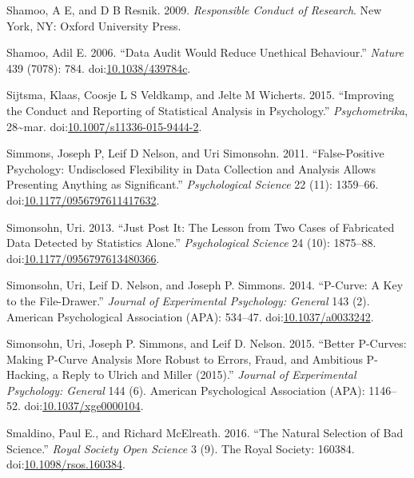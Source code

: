 \documentclass[a5paper]{book}
\begin{document}
\hypertarget{ref-isbn:9780199376025}{}
Shamoo, A E, and D B Resnik. 2009. \emph{Responsible Conduct of
Research}. New York, NY: Oxford University Press.

\hypertarget{ref-doi:10.1038ux2f439784c}{}
Shamoo, Adil E. 2006. ``Data Audit Would Reduce Unethical Behaviour.''
\emph{Nature} 439 (7078): 784.
doi:\href{https://doi.org/10.1038/439784c}{10.1038/439784c}.

\hypertarget{ref-doi:10.1007ux2fs11336-015-9444-2}{}
Sijtsma, Klaas, Coosje L S Veldkamp, and Jelte M Wicherts. 2015.
``Improving the Conduct and Reporting of Statistical Analysis in
Psychology.'' \emph{Psychometrika}, 28\textasciitilde{}mar.
doi:\href{https://doi.org/10.1007/s11336-015-9444-2}{10.1007/s11336-015-9444-2}.

\hypertarget{ref-doi:10.1177ux2f0956797611417632}{}
Simmons, Joseph P, Leif D Nelson, and Uri Simonsohn. 2011.
``False-Positive Psychology: Undisclosed Flexibility in Data Collection
and Analysis Allows Presenting Anything as Significant.''
\emph{Psychological Science} 22 (11): 1359--66.
doi:\href{https://doi.org/10.1177/0956797611417632}{10.1177/0956797611417632}.

\hypertarget{ref-doi:10.1177ux2f0956797613480366}{}
Simonsohn, Uri. 2013. ``Just Post It: The Lesson from Two Cases of
Fabricated Data Detected by Statistics Alone.'' \emph{Psychological
Science} 24 (10): 1875--88.
doi:\href{https://doi.org/10.1177/0956797613480366}{10.1177/0956797613480366}.

\hypertarget{ref-doi:10.1037ux2fa0033242}{}
Simonsohn, Uri, Leif D. Nelson, and Joseph P. Simmons. 2014. ``P-Curve:
A Key to the File-Drawer.'' \emph{Journal of Experimental Psychology:
General} 143 (2). American Psychological Association (APA): 534--47.
doi:\href{https://doi.org/10.1037/a0033242}{10.1037/a0033242}.

\hypertarget{ref-doi:10.1037ux2fxge0000104}{}
Simonsohn, Uri, Joseph P. Simmons, and Leif D. Nelson. 2015. ``Better
P-Curves: Making P-Curve Analysis More Robust to Errors, Fraud, and
Ambitious P-Hacking, a Reply to Ulrich and Miller (2015).''
\emph{Journal of Experimental Psychology: General} 144 (6). American
Psychological Association (APA): 1146--52.
doi:\href{https://doi.org/10.1037/xge0000104}{10.1037/xge0000104}.

\hypertarget{ref-doi:10.1098ux2frsos.160384}{}
Smaldino, Paul E., and Richard McElreath. 2016. ``The Natural Selection
of Bad Science.'' \emph{Royal Society Open Science} 3 (9). The Royal
Society: 160384.
doi:\href{https://doi.org/10.1098/rsos.160384}{10.1098/rsos.160384}.
\end{document}
